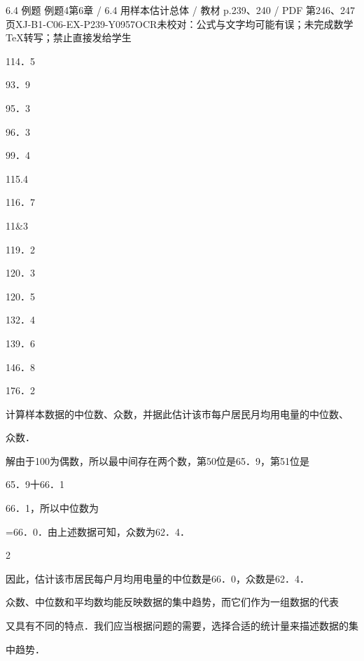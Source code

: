 \begin{bankitem}{6.4 例题 例题4}{第6章 / 6.4 用样本估计总体 / 教材 p.239、240 / PDF 第246、247页}{XJ-B1-C06-EX-P239-Y0957}{OCR未校对：公式与文字均可能有误；未完成数学TeX转写；禁止直接发给学生}
\begin{ocrdraft}
114．5
\par
93．9
\par
95．3
\par
96．3
\par
99．4
\par
115.4
\par
116．7
\par
11\&3
\par
119．2
\par
120．3
\par
120．5
\par
132．4
\par
139．6
\par
146．8
\par
176．2
\par
计算样本数据的中位数、众数，并据此估计该市每户居民月均用电量的中位数、
\par
众数．
\par
[教材p.240 / PDF第247页]
\par
解由于100为偶数，所以最中间存在两个数，第50位是65．9，第51位是
\par
65．9十66．1
\par
66．1，所以中位数为
\par
=66．0．由上述数据可知，众数为62．4．
\par
2
\par
因此，估计该市居民每户月均用电量的中位数是66．0，众数是62．4．
\par
众数、中位数和平均数均能反映数据的集中趋势，而它们作为一组数据的代表
\par
又具有不同的特点．我们应当根据问题的需要，选择合适的统计量来描述数据的集
\par
中趋势．
\end{ocrdraft}
\end{bankitem}

